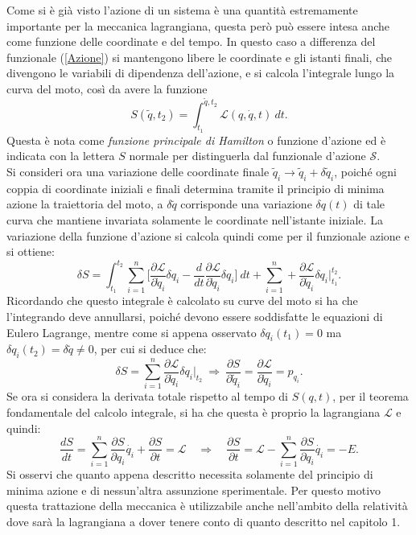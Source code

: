 Come si è già visto l'azione di un sistema è una quantità estremamente importante per la meccanica lagrangiana, questa però può essere intesa anche come funzione delle coordinate e del tempo. In questo caso a differenza del funzionale (\ref{Azione}) si mantengono libere le coordinate e gli istanti finali, che divengono le variabili di dipendenza dell'azione, e si calcola l'integrale lungo la curva del moto, così da avere la funzione
\begin{equation}
    S (\tilde q,t_2)=\int_{t_1}^{\tilde q,t_2} \mathcal{L} (q,\dot q,t)\ dt.
\end{equation}
Questa è nota come \emph{funzione principale di Hamilton} o funzione d'azione ed è indicata con la lettera $S$ normale per distinguerla dal funzionale d'azione $\mathcal{S} $.\\
Si consideri ora una variazione delle coordinate finale $\tilde q_i\rightarrow \tilde q_i+\delta \tilde q_i$, poiché ogni coppia di coordinate iniziali e finali determina tramite il principio di minima azione la traiettoria del moto, a $\delta \tilde q$ corrisponde una variazione $\delta q(t)$ di tale curva che mantiene invariata solamente le coordinate nell'istante iniziale. La variazione della funzione d'azione si calcola quindi come per il funzionale azione e si ottiene:
\begin{equation*}
    \delta S=\int_{t_1}^{t_2}\sum_{i=1}^{n}\bigg[\frac{\partial\mathcal{L} }{\partial \dot  q_i}\delta q_i-\frac{d}{dt}\frac{\partial\mathcal{L} }{\partial \dot{q}_i}\delta q_i \bigg]\ dt+\sum_{i=1}^n+\frac{\partial\mathcal{L} }{\partial \dot q_i}\delta q_i\bigg|_{t_1}^{t_2}.
\end{equation*}
Ricordando che questo integrale è calcolato su curve del moto si ha che l'integrando deve annullarsi, poiché devono essere soddisfatte le equazioni di Eulero Lagrange, mentre come si appena osservato $\delta q_i(t_1)=0$ ma $\delta q_i(t_2)=\delta \tilde q\neq0$, per cui si deduce che:
\begin{equation*}
    \delta S=\sum_{i=1}^n\frac{\partial\mathcal{L} }{\partial \dot q_i}\delta q_i\bigg|_{t_2}\ \Rightarrow\ \frac{\partial S}{\partial \tilde q_i}= \frac{\partial\mathcal{L} }{\partial \dot q_i}=p_{q_i}.
\end{equation*}
Se ora si considera la derivata totale rispetto al tempo di $S(q,t)$, per il teorema fondamentale del calcolo integrale, si ha che questa è proprio la lagrangiana $\mathcal{L} $ e quindi:
\begin{equation*}
    \frac{dS}{dt}=\sum_{i=1}^n\frac{\partial S }{\partial  q_i}\dot{q_i}+\frac{\partial S }{\partial t}=\mathcal{L}\quad \Rightarrow\quad \frac{\partial S }{\partial t}=\mathcal{L} -\sum_{i=1}^n\frac{\partial S }{\partial  q_i}\dot{q_i}=-E.
\end{equation*} 
Si osservi che quanto appena descritto necessita solamente del principio di minima azione e di nessun'altra assunzione sperimentale. Per questo motivo questa trattazione della meccanica è utilizzabile anche nell'ambito della relatività dove sarà la lagrangiana a dover tenere conto di quanto descritto nel capitolo 1.